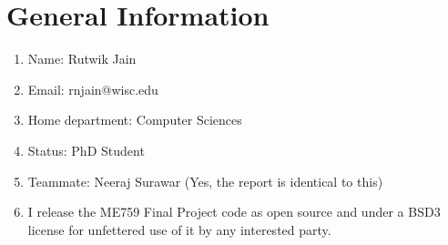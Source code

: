 \documentclass[12pt]{article}
\theoremstyle{definition}
\begin{document}
\newpage
\renewcommand{\baselinestretch}{0.2}\normalsize
\tableofcontents
\renewcommand{\baselinestretch}{1.0}\normalsize

\newpage
\section{General Information}
\begin{enumerate}
    \item Name: Rutwik Jain
    \item Email: rnjain@wisc.edu
    \item Home department: Computer Sciences
    \item Status: PhD Student
    \item Teammate: Neeraj Surawar (Yes, the report is identical to this)
    \item I release the ME759 Final Project code as open source and under a BSD3 license for unfettered use of it by any interested party.
\end{enumerate}








\printbibliography
\end{document}
